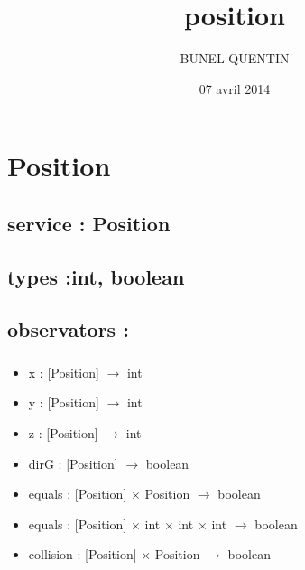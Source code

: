 \documentclass[11pt]{article}
\title{position}
\author{BUNEL QUENTIN}
\date{07 avril 2014}
\begin{document}
\maketitle

\setcounter{tocdepth}{3}
\tableofcontents
\vspace*{1cm}
\section{Position}
\label{sec-1}

\subsection{service : Position}
\label{sec-1.1}

\subsection{types :int, boolean}
\label{sec-1.2}


\subsection{observators :}
\label{sec-1.3}

\subsubsection{}

\begin{itemize}

\item x : [Position] $\to$ int\\
\label{sec-1.3.1.1}


\item y : [Position] $\to$ int\\
\label{sec-1.3.1.2}


\item z : [Position] $\to$ int\\
\label{sec-1.3.1.3}


\item dirG : [Position] $\to$ boolean\\
\label{sec-1.3.1.4}


\item equals : [Position] $\times$ Position $\to$ boolean\\
\label{sec-1.3.1.5}


\item equals : [Position] $\times$ int $\times$ int $\times$ int $\to$ boolean\\
\label{sec-1.3.1.6}


\item collision : [Position] $\times$ Position $\to$ boolean\\
\label{sec-1.3.1.7}


\end{itemize} %
\end{document}
